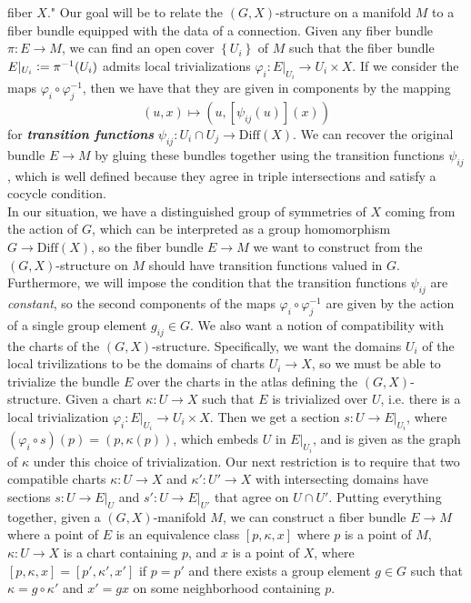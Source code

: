 \documentclass[psamsfonts, 12pt]{amsart}
\theoremstyle{definition}
\theoremstyle{remark}
\newcommand{\ib}[1]{\textbf{\textit{#1}}}
\newcommand{\inv}{^{-1}}
\newcommand{\set}[1]{\left\lbrace #1 \right\rbrace}
\newcommand{\defeq}{\vcentcolon=}
\begin{document}
fiber $X$." Our goal will be to relate the $(G,X)$-structure on a manifold $M$
to a fiber bundle equipped with the data of a connection. Given
any fiber bundle $\pi : E \to M$, we can find an open cover $\set{U_i}$ of $M$ such
that the fiber bundle $E\vert_{U_i} \defeq \pi\inv(U_i)$ admits local trivializations
$\varphi_i : E\vert_{U_i} \to U_i \times X$. If we consider the maps
$\varphi_i \circ \varphi_j\inv$, then we have that they are given in components
by the mapping
\[
(u,x) \mapsto (u, [\psi_{ij}(u)](x))
\]
for \ib{transition functions} $\psi_{ij} : U_i \cap U_j \to \mathrm{Diff}(X)$.
We can recover the original bundle $E \to M$ by gluing these bundles together
using the transition functions $\psi_{ij}$, which is well defined because they
agree in triple intersections and satisfy a cocycle condition. \\

In our situation, we have a distinguished group of symmetries of $X$ coming
from the action of $G$, which can be interpreted as a group
homomorphism $G \to \mathrm{Diff}(X)$, so the fiber bundle $E \to M$ we want to
construct from the $(G,X)$-structure on $M$ should have transition functions
valued in $G$. Furthermore, we will impose the condition
that the transition functions $\psi_{ij}$ are \emph{constant}, so
the second components of the maps $\varphi_i\circ\varphi_j\inv$ are given by the
action of a single group element $g_{ij} \in G$. We also want a notion of compatibility
with the charts of the $(G,X)$-structure. Specifically, we want the domains $U_i$ of
the local trivilizations to be the domains of charts $U_i \to X$, so we must be able to
trivialize the bundle $E$ over the charts in the atlas defining the $(G,X)$-structure.
Given a chart $\kappa : U \to X$ such that $E$ is trivialized
over $U$, i.e. there is a local trivialization
$\varphi_i : E\vert_{U_i} \to U_i \times X$. Then we get a section
$s : U \to E\vert_{U_i}$, where $(\varphi_i \circ s)(p) = (p, \kappa(p))$, which
embeds $U$ in $E\vert_{U_i}$, and is given as the graph of $\kappa$ under this
choice of trivialization. Our next restriction is to require that
two compatible charts $\kappa : U \to X$ and $\kappa' : U' \to X$ with intersecting
domains have sections $s : U \to E\vert_U$ and $s' : U \to E\vert_{U'}$
that agree on $U \cap U'$. Putting everything together, given a $(G,X)$-manifold
$M$, we can construct a fiber bundle $E \to M$ where a point of $E$ is an equivalence
class $[p,\kappa, x]$ where $p$ is a point of $M$, $\kappa : U \to X$ is a chart
containing $p$, and $x$ is a point of $X$, where $[p,\kappa, x] = [p', \kappa', x']$
if $p = p'$ and there exists a group element $g \in G$ such that
$\kappa = g \circ \kappa'$ and $x' = gx$ on some neighborhood containing $p$. \\
\end{document}
